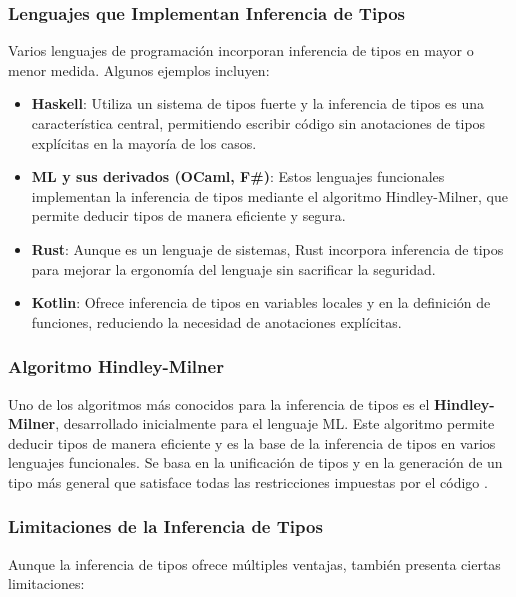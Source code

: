 \documentclass{article}
\begin{document}
  \subsubsection{Lenguajes que Implementan Inferencia de Tipos}

  Varios lenguajes de programación incorporan inferencia de tipos en mayor o menor medida. Algunos ejemplos incluyen:

  \begin{itemize}
    \item \textbf{Haskell}: Utiliza un sistema de tipos fuerte y la inferencia de tipos es una característica central, permitiendo escribir código sin anotaciones de tipos explícitas en la mayoría de los casos.

    \item \textbf{ML y sus derivados (OCaml, F\#)}: Estos lenguajes funcionales implementan la inferencia de tipos mediante el algoritmo Hindley-Milner, que permite deducir tipos de manera eficiente y segura.

    \item \textbf{Rust}: Aunque es un lenguaje de sistemas, Rust incorpora inferencia de tipos para mejorar la ergonomía del lenguaje sin sacrificar la seguridad.

    \item \textbf{Kotlin}: Ofrece inferencia de tipos en variables locales y en la definición de funciones, reduciendo la necesidad de anotaciones explícitas.
  \end{itemize}

  \subsubsection{Algoritmo Hindley-Milner}

  Uno de los algoritmos más conocidos para la inferencia de tipos es el \textbf{Hindley-Milner}, desarrollado inicialmente para el lenguaje ML. Este algoritmo permite deducir tipos de manera eficiente y es la base de la inferencia de tipos en varios lenguajes funcionales. Se basa en la unificación de tipos y en la generación de un tipo más general que satisface todas las restricciones impuestas por el código \cite{hindley1969principal}.

  \subsubsection{Limitaciones de la Inferencia de Tipos}

  Aunque la inferencia de tipos ofrece múltiples ventajas, también presenta ciertas limitaciones:
\end{document}
